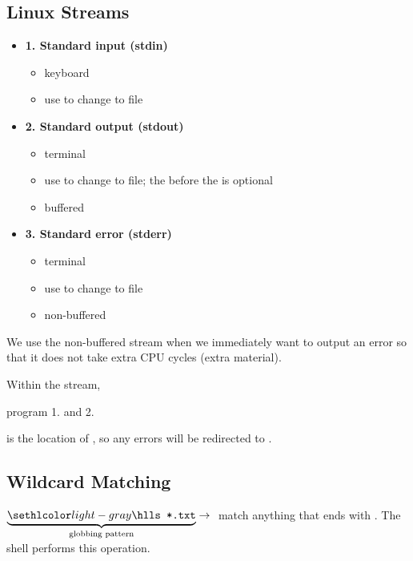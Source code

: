 \subsection{Linux Streams}

\begin{itemize}
    \item \textbf{1. Standard input (stdin)}
          \begin{itemize}
              \item keyboard
              \item use \code{<} to change to file
          \end{itemize}
    \item \textbf{2. Standard output (stdout)}
          \begin{itemize}
              \item terminal
              \item use  to change to file; the  before the \code{>} is optional
              \item buffered
          \end{itemize}
    \item \textbf{3. Standard error (stderr)}
          \begin{itemize}
              \item terminal
              \item use  to change to file
              \item non-buffered
          \end{itemize}
\end{itemize}

We use the non-buffered stream when we immediately want to output an error
so that it does not take extra CPU cycles (extra material).

Within the stream,

 \textrightarrow{} program \textrightarrow{}
1.  and 2. 

 \textrightarrow{}
 is the location of , so any errors will be redirected to
.

\subsection{Wildcard Matching}
$ \underbrace{\code{ls *.txt}}_{\text{globbing pattern}} \rightarrow{} $
match anything that ends with . The shell performs this operation.

